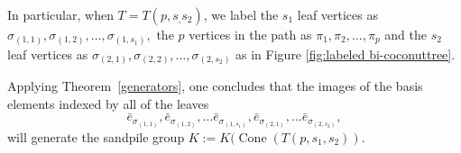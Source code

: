 \documentclass[10pt,reqno]{amsart}
\DeclareMathOperator{\Cone}{Cone}
\begin{document}
In particular, when $T=T(p,s_,s_2)$, we label the $s_1$ leaf vertices as $\sigma_{(1,1)},\sigma_{(1,2)},\ldots,\sigma_{(1,s_1)},$  the  $p$ vertices in the path as $\pi_1,\pi_2,\ldots,\pi_p$ and the  $s_2$ leaf vertices as $\sigma_{(2,1)},\sigma_{(2,2)},\ldots,\sigma_{(2,s_2)}$ as in Figure \ref{fig:labeled bi-coconuttree}.  

Applying Theorem~\ref{generators},
one concludes that the images of the basis
elements indexed by all of the leaves
\begin{equation}
\label{leaf-images}
\bar{e}_{\sigma_{(1,1)}},
\bar{e}_{\sigma_{(1,2)}},
\ldots
\bar{e}_{\sigma_{(1,s_1)}},
\bar{e}_{\sigma_{(2,1)}},
\ldots
\bar{e}_{\sigma_{(2,s_2)}},
\end{equation}
will generate the sandpile group $K:=K(\Cone(T(p,s_1,s_2))$.
\end{document}
